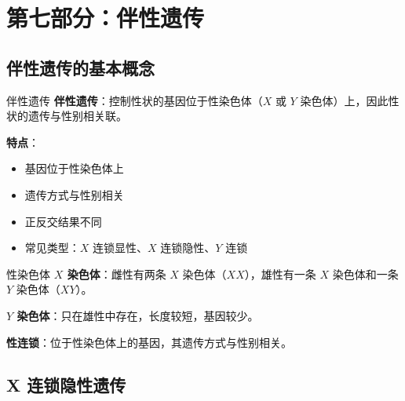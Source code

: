 \documentclass[a4paper,11pt]{ctexart}
\begin{document}

\section{第七部分：伴性遗传}

\subsection{伴性遗传的基本概念}

\begin{definitionbox}{伴性遗传}
\textbf{伴性遗传}：控制性状的基因位于性染色体（$X$ 或 $Y$ 染色体）上，因此性状的遗传与性别相关联。

\textbf{特点}：
\begin{itemize}[leftmargin=2em]
    \item 基因位于性染色体上
    \item 遗传方式与性别相关
    \item 正反交结果不同
    \item 常见类型：$X$ 连锁显性、$X$ 连锁隐性、$Y$ 连锁
\end{itemize}
\end{definitionbox}

\begin{definitionbox}{性染色体}
\textbf{$X$ 染色体}：雌性有两条 $X$ 染色体（$XX$），雄性有一条 $X$ 染色体和一条 $Y$ 染色体（$XY$）。

\textbf{$Y$ 染色体}：只在雄性中存在，长度较短，基因较少。

\textbf{性连锁}：位于性染色体上的基因，其遗传方式与性别相关。
\end{definitionbox}

\subsection{X 连锁隐性遗传}
\end{document}
